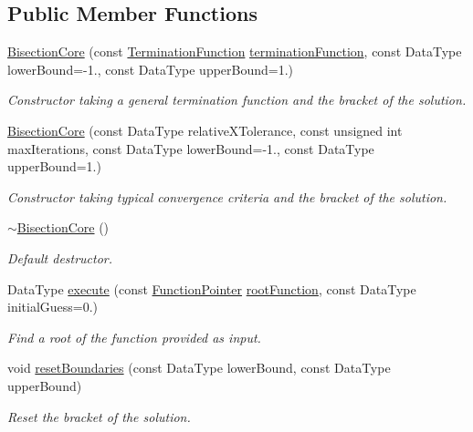 \subsection*{Public Member Functions}
\begin{DoxyCompactItemize}
\item 
\hyperlink{classtudat_1_1root__finders_1_1BisectionCore_a947611a377418f1bbaf3e02c3e1b1ccd}{Bisection\+Core} (const \hyperlink{classtudat_1_1root__finders_1_1BisectionCore_a4bfc03809c03253f1e3602cb75335adf}{Termination\+Function} \hyperlink{classtudat_1_1root__finders_1_1RootFinderCore_a7a1efe7ce979318d398b4bb8574e70d6}{termination\+Function}, const Data\+Type lower\+Bound=-\/1., const Data\+Type upper\+Bound=1.)
\begin{DoxyCompactList}\small\item\em Constructor taking a general termination function and the bracket of the solution. \end{DoxyCompactList}\item 
\hyperlink{classtudat_1_1root__finders_1_1BisectionCore_a631cdc22e0e5c364af8ba37af4183918}{Bisection\+Core} (const Data\+Type relative\+X\+Tolerance, const unsigned int max\+Iterations, const Data\+Type lower\+Bound=-\/1., const Data\+Type upper\+Bound=1.)
\begin{DoxyCompactList}\small\item\em Constructor taking typical convergence criteria and the bracket of the solution. \end{DoxyCompactList}\item 
\hyperlink{classtudat_1_1root__finders_1_1BisectionCore_a51134d2717d23f95189d0d6eaddcb622}{$\sim$\+Bisection\+Core} ()\hypertarget{classtudat_1_1root__finders_1_1BisectionCore_a51134d2717d23f95189d0d6eaddcb622}{}\label{classtudat_1_1root__finders_1_1BisectionCore_a51134d2717d23f95189d0d6eaddcb622}

\begin{DoxyCompactList}\small\item\em Default destructor. \end{DoxyCompactList}\item 
Data\+Type \hyperlink{classtudat_1_1root__finders_1_1BisectionCore_ab8798225ad2e0ffa6d44b462b6f24584}{execute} (const \hyperlink{classtudat_1_1root__finders_1_1BisectionCore_aaceafb2a0ce4effa2862eea28d7869c3}{Function\+Pointer} \hyperlink{classtudat_1_1root__finders_1_1RootFinderCore_afbe57f7fa3baba13128d9dc2ca41dedd}{root\+Function}, const Data\+Type initial\+Guess=0.)
\begin{DoxyCompactList}\small\item\em Find a root of the function provided as input. \end{DoxyCompactList}\item 
void \hyperlink{classtudat_1_1root__finders_1_1BisectionCore_ad493b8969c88ebb93eb6086f053cec98}{reset\+Boundaries} (const Data\+Type lower\+Bound, const Data\+Type upper\+Bound)
\begin{DoxyCompactList}\small\item\em Reset the bracket of the solution. \end{DoxyCompactList}\end{DoxyCompactItemize}
